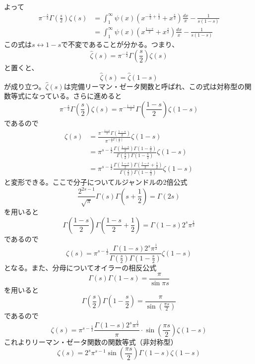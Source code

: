 \documentclass{jsarticle}
\begin{document}
よって
\begin{align*}
\pi^{-\frac{s}{2}}\Gamma\left(\frac{s}{2}\right)\zeta(s)&=\int_{1}^{\infty}\psi(x)\left(x^{-\frac{s}{2}+\frac{1}{2}}+x^{\frac{s}{2}}\right)\frac{dx}{x}-\frac{1}{s(1-s)}\\
&=\int_{1}^{\infty}\psi(x)\left(x^{\frac{1-s}{2}}+x^{\frac{s}{2}}\right)\frac{dx}{x}-\frac{1}{s(1-s)}
\end{align*}
この式は\(s\longleftrightarrow 1-s\)で不変であることが分かる。つまり、
\begin{equation}
\hat{\zeta}(s)=\pi^{-\frac{s}{2}}\Gamma\left(\frac{s}{2}\right)\zeta(s)
\end{equation}
と置くと、
\begin{equation}
\hat{\zeta}(s)=\hat{\zeta}(1-s)
\end{equation}
が成り立つ。\(\hat{\zeta}(s)\)は完備リーマン・ゼータ関数と呼ばれ、この式は対称型の関数等式になっている。さらに進めると
\[\pi^{-\frac{s}{2}}\Gamma\left(\frac{s}{2}\right)\zeta(s)=\pi^{-\frac{1-s}{2}}\Gamma\left(\frac{1-s}{2}\right)\zeta(1-s)\]
であるので
\begin{align*}
\zeta(s)&=\frac{\pi^{-\frac{1-s}{2}}\Gamma\left(\frac{1-s}{2}\right)}{\pi^{-\frac{s}{2}\Gamma\left(\frac{s}{2}\right)}}\zeta(1-s)\\
&=\pi^{s-\frac{1}{2}}\frac{\Gamma\left(\frac{1-s}{2}\right)\Gamma\left(1-\frac{s}{2}\right)}{\Gamma\left(\frac{s}{2}\right)\Gamma\left(1-\frac{s}{2}\right)}\zeta(1-s)\\
&=\pi^{s-\frac{1}{2}}\frac{\Gamma\left(\frac{1-s}{2}\right)\Gamma\left(\frac{1-s}{2}+\frac{1}{2}\right)}{\Gamma\left(\frac{s}{2}\right)\Gamma\left(1-\frac{s}{2}\right)}\zeta(1-s)
\end{align*}
と変形できる。ここで分子についてルジャンドルの2倍公式
\[
\frac{2^{2s-1}}{\sqrt{\pi}}\Gamma(s)\Gamma\left(s+\frac{1}{2}\right)=\Gamma(2s)
\]
を用いると
\[
\Gamma\left(\frac{1-s}{2}\right)\Gamma\left(\frac{1-s}{2}+\frac{1}{2}\right)=\Gamma(1-s)2^{s}\pi^{\frac{1}{2}}
\]
であるので
\[\zeta(s)=\pi^{s-\frac{1}{2}}\frac{\Gamma(1-s)2^{s}\pi^{\frac{1}{2}}}{\Gamma\left(\frac{s}{2}\right)\Gamma\left(1-\frac{s}{2}\right)}\zeta(1-s)\]
となる。また、分母についてオイラーの相反公式
\[\Gamma(s)\Gamma(1-s)=\frac{\pi}{\sin \pi s}\]
を用いると
\[\Gamma\left(\frac{s}{2}\right)\Gamma\left(1-\frac{s}{2}\right)=\frac{\pi}{\sin\left(\frac{\pi s}{2}\right)}\]
であるので
\[
\zeta(s)=\pi^{s-\frac{1}{2}}\frac{\Gamma(1-s)2^{s}\pi^{\frac{1}{2}}}{\pi}\cdot\sin\left(\frac{\pi s}{2}\right)\zeta(1-s)
\]
これよりリーマン・ゼータ関数の関数等式（非対称型）
\begin{equation}
\zeta(s)=2^{s}\pi^{s-1}\sin\left(\frac{\pi s}{2}\right)\Gamma(1-s)\zeta(1-s)
\end{equation}
\end{document}
